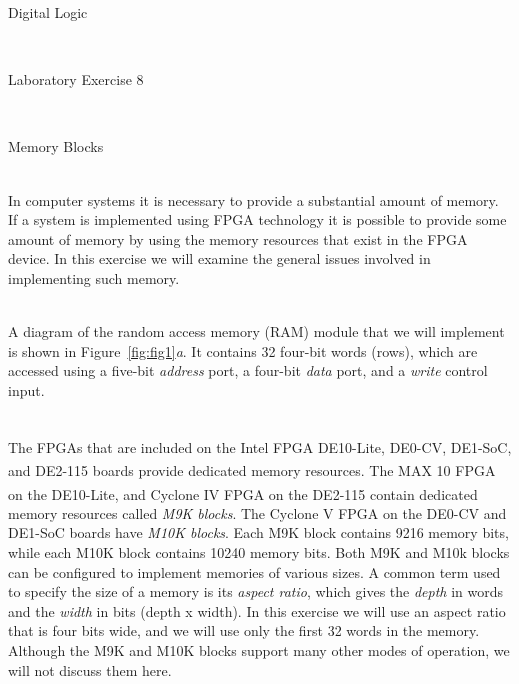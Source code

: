\documentclass[epsfig,10pt,fullpage]{article}
\newcommand{\LabNum}{8}
\begin{document}
\centerline{\huge Digital Logic}
~\\
\centerline{\huge Laboratory Exercise \LabNum}
~\\
\centerline{\large Memory Blocks}
~\\

In computer systems it is necessary to provide a substantial amount of memory.
If a system is implemented using FPGA technology it is possible
to provide some amount of memory by using the memory resources that exist
in the FPGA device.  In this exercise we will examine the general issues involved in 
implementing such memory.

~\\
A diagram of the random access memory (RAM) module that we will implement is shown in Figure~\ref{fig:fig1}{\it a}. It contains 32 four-bit words (rows), which are accessed using a five-bit
{\it address} port, a four-bit {\it data} port, and a {\it write} control input.

~\\
The FPGAs that are included on the Intel\textsuperscript{\textregistered} FPGA DE10-Lite, DE0-CV, DE1-SoC, and DE2-115 boards 
provide dedicated memory resources.  The MAX\textsuperscript{\textregistered} 10 FPGA on the DE10-Lite, and Cyclone\textsuperscript{\textregistered} IV FPGA
on the DE2-115 contain dedicated memory resources called {\it M9K blocks}. The Cyclone V FPGA 
on the DE0-CV and DE1-SoC boards have {\it M10K blocks}. Each M9K block contains 9216 memory 
bits, while each M10K block contains 10240 memory bits. Both M9K and M10k blocks can be 
configured to implement memories of various sizes. A common term used to specify the size of 
a memory is its {\it aspect ratio}, which gives the {\it depth} in words and the {\it width} 
in bits (depth {\sf x} width). In this exercise we will use an aspect ratio that is four
bits wide, and we will use only the first 32 words in the memory. Although the M9K and M10K 
blocks support many other modes of operation, we will not discuss them here.
\end{document}
